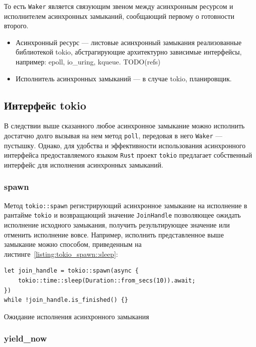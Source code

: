 То есть \verb|Waker| является связующим звеном между асинхронным ресурсом и исполнителем асинхронных замыканий, сообщающий первому о готовности второго.

\begin{itemize}
    \item Асинхронный ресурс --- листовые асинхронный замыкания реализованные библиотекой tokio, абстрагирующие архитектурно зависимые интерфейсы, например: epoll, io\_uring, kqueue. TODO(refs)
    \item Исполнитель асинхронных замыканий --- в случае tokio, планировщик.
\end{itemize}

\subsection{Интерфейс tokio}

В следствии выше сказанного любое асинхронное замыкание можно исполнить достатчно долго вызывая на нем метод \verb|poll|, передовая в него \verb|Waker| --- пустышку. Однако, для удобства и эффективности использования асинхронного интерфейса предоставляемого языком \verb|Rust| проект \verb|tokio| предлагает собственный интерфейс для исполнения асинхронных замыканий.

\subsubsection{spawn}

Метод \verb|tokio::spawn| регистрирующий асинхронное замыкание на исполнение в рантайме \verb|tokio| и возвращающий значение \verb|JoinHandle| позволяющее ожидать исполнение исходного замыкания, получить результирующее значение или отменить исполнение вовсе. Например, исполнить представленное выше замыкание можно способом, приведенным на листинге~\ref{listing:tokio_spawn::sleep}:

\begin{listing}[H]
    \begin{verbatim}
let join_handle = tokio::spawn(async {
    tokio::time::sleep(Duration::from_secs(10)).await;
})
while !join_handle.is_finished() {}
    \end{verbatim}

    \caption{Ожидание исполнения асинхронного замыкания}
    \label{listing:tokio_spawn::sleep}
\end{listing}

\subsubsection{yield\_now}

